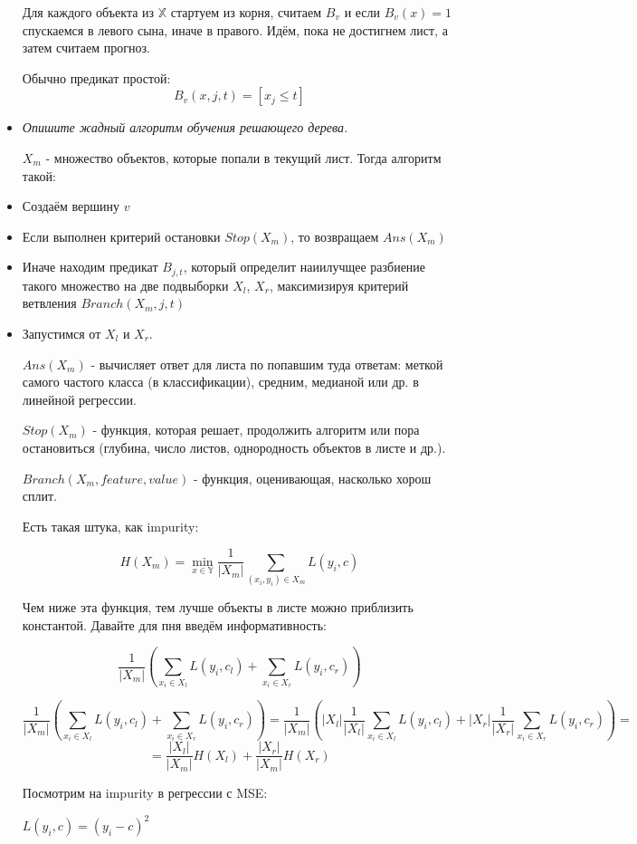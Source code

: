 \documentclass[12pt]{article}
\begin{document}
\begin{itemize}
Для каждого объекта из $\mathbb{X}$ стартуем из корня, считаем $B_v$ и если $B_v(x) = 1$ спускаемся в левого сына, иначе в правого. Идём, пока не достигнем лист, а затем считаем прогноз.

Обычно предикат простой:
\[ B_v(x, j, t) = [x_j \leq t] \]

\item \textit{ Опишите жадный алгоритм обучения решающего дерева.}

$X_m$ - множество объектов, которые попали в текущий лист. Тогда алгоритм такой:

\item Создаём вершину $v$
\item Если выполнен критерий остановки $Stop(X_m)$, то возвращаем $Ans(X_m)$
\item Иначе находим предикат $B_{j, t}$, который определит наиилучщее разбиение такого множество на две подвыборки $X_l$, $X_r$, максимизируя критерий ветвления $Branch(X_m, j, t)$
\item Запустимся от $X_l$ и $X_r$.


$Ans(X_m)$ - вычисляет ответ для листа по попавшим туда ответам: меткой самого частого класса (в классификации), средним, медианой или др. в линейной регрессии.

$Stop(X_m)$ - функция, которая решает, продолжить алгоритм или пора остановиться (глубина, число листов, однородность объектов в листе и др.).

$Branch(X_m, feature, value)$ - функция, оценивающая, насколько хорош сплит.

Есть такая штука, как impurity:

\[ H(X_m) = \min_{x \in \mathbb{Y}} \frac{1}{|X_m|} \sum_{(x_i, y_i) \in X_m} L(y_i, c) \]

Чем ниже эта функция, тем лучше объекты в листе можно приблизить константой. Давайте для пня введём информативность:

\[ \frac{1}{|X_m|} \left( \sum_{x_i \in X_l} L(y_i, c_l) + \sum_{x_i \in X_r} L(y_i, c_r) \right) \]

\[ \frac{1}{|X_m|} \left( \sum_{x_i \in X_l} L(y_i, c_l) + \sum_{x_i \in X_r} L(y_i, c_r) \right) = 
\frac{1}{|X_m|} \left( |X_l| \frac{1}{|X_l|} \sum_{x_i \in X_l} L(y_i, c_l) + |X_r| \frac{1}{|X_r|} \sum_{x_i \in X_r} L(y_i, c_r) \right) =\]
\[ =  \frac{|X_l|}{|X_m|} H(X_l) + \frac{|X_r|}{|X_m|}H(X_r)\]

Посмотрим на impurity в регрессии с MSE:

$L(y_i, c) = (y_i-c)^2$


\end{itemize}
\end{document}
